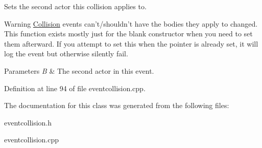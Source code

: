 Sets the second actor this collision applies to. 

\begin{DoxyWarning}{Warning}
\hyperlink{classMezzanine_1_1Collision}{Collision} events can't/shouldn't have the bodies they apply to changed. This function exists mostly just for the blank constructor when you need to set them afterward. If you attempt to set this when the pointer is already set, it will log the event but otherwise silently fail. 
\end{DoxyWarning}

\begin{DoxyParams}{Parameters}
{\em B} & The second actor in this event. \\
\hline
\end{DoxyParams}


Definition at line 94 of file eventcollision.cpp.



The documentation for this class was generated from the following files:\begin{DoxyCompactItemize}
\item 
eventcollision.h\item 
eventcollision.cpp\end{DoxyCompactItemize}
